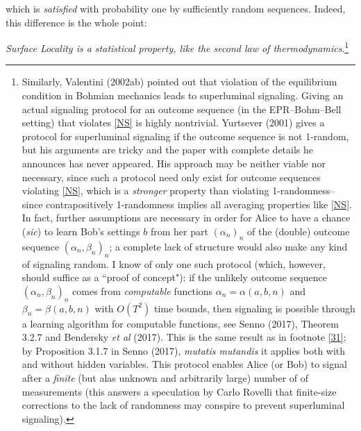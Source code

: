 \documentclass[12pt]{article}
\numberwithin{equation}{section}
\newcommand{\er}{\eqref}
\newcommand{\al}{\alpha} \newcommand{\bt}{L\beta}
\begin{document}
 which is \emph{satisfied} with 
probability one by sufficiently random sequences. Indeed, this difference is the whole point:
\begin{center}
 \emph{Surface Locality is a statistical property, like the second law of thermodynamics}.\footnote{
Similarly, Valentini (2002ab)  pointed out that violation of  the equilibrium condition in Bohmian mechanics leads to superluminal signaling. Giving an actual signaling protocol for an outcome sequence  (in the EPR--Bohm--Bell setting) that violates \er{NS} is highly nontrivial. 
 Yurtsever (2001) gives a protocol for superluminal signaling if the outcome sequence is not 1-random, but his arguments are tricky and the paper with complete details he announces has never appeared.  His approach may  be neither viable nor necessary, since such a protocol need only exist for outcome sequences violating \er{NS}, which is a \emph{stronger} property than violating 1-randomness--since contrapositively 1-randomness implies all averaging properties like \er{NS}. In fact, further assumptions are necessary in order for Alice to have a chance (\emph{sic}) to learn Bob's settings $b$ from her part $(\al_n)_n$ of the (double) outcome sequence $(\al_n,\beta_n)_n$; a complete lack of structure would also make any kind of signaling random. I know of only one such protocol (which, however,  should  suffice as a ``proof of concept"): if the unlikely outcome sequence $(\al_n,\beta_n)_n$ comes from \emph{computable} functions $\al_n=\al(a,b,n)$ and $\beta_n=\beta(a,b,n)$ with $O(T^2)$ time bounds, then signaling is possible through a learning algorithm for computable functions, see Senno (2017), Theorem 3.2.7 and Bendersky \emph{et al} (2017). This is the same result as in footnote \ref{31}; by Proposition 3.1.7 in Senno (2017), \emph{mutatis mutandis} it applies both with and without hidden variables.
 This protocol enables Alice (or Bob) to signal after a \emph{finite} (but alas unknown and arbitrarily large) number of of measurements (this answers a speculation by
 Carlo Rovelli that  finite-size corrections to the lack of randomness may conspire to prevent superluminal signaling).
 }
\end{center}
 \appendix
\end{document}
